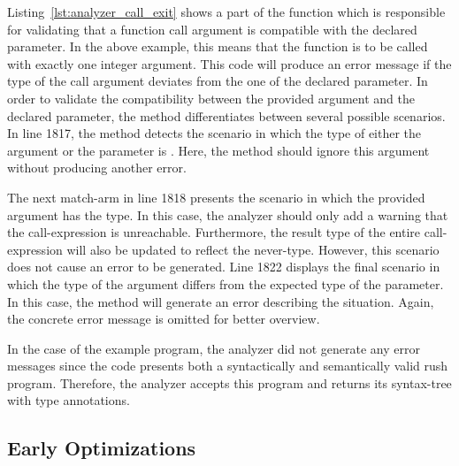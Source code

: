 
Listing~\ref{lst:analyzer_call_exit} shows a part of the  function which is responsible for validating that a function call argument is compatible with the declared parameter.
In the above example, this means that the  function is to be called with exactly one integer argument.
This code will produce an error message if the type of the call argument deviates from the one of the declared parameter.
In order to validate the compatibility between the provided argument and the declared parameter, the method differentiates between several possible scenarios.
In line 1817, the method detects the scenario in which the type of either the argument or the parameter is .
Here, the method should ignore this argument without producing another error.

The next match-arm in line 1818 presents the scenario in which the provided argument has the  type.
In this case, the analyzer should only add a warning that the call-expression is unreachable.
Furthermore, the result type of the entire call-expression will also be updated to reflect the never-type.
However, this scenario does not cause an error to be generated.
Line 1822 displays the final scenario in which the type of the argument differs from the expected type of the parameter.
In this case, the method will generate an error describing the situation.
Again, the concrete error message is omitted for better overview.

In the case of the example program, the analyzer did not generate any error messages since the code presents both a syntactically and semantically valid rush program.
Therefore, the analyzer accepts this program and returns its syntax-tree with type annotations.

\subsection{Early Optimizations}


